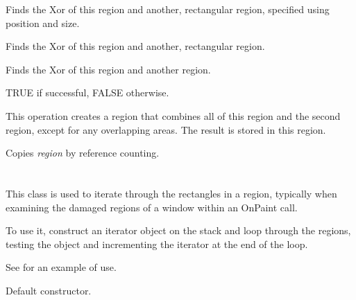Finds the Xor of this region and another, rectangular region, specified using position and size.


Finds the Xor of this region and another, rectangular region.


Finds the Xor of this region and another region.


TRUE if successful, FALSE otherwise.


This operation creates a region that combines all of this region and the second region, except
for any overlapping areas. The result is stored in this region.

\label{wxregionassign}


Copies {\it region} by reference counting.

\section{}\label{wxregioniterator}

This class is used to iterate through the rectangles in a region,
typically when examining the damaged regions of a window within an OnPaint call.

To use it, construct an iterator object on the stack and loop through the
regions, testing the object and incrementing the iterator at the end of the loop.

See  for an example of use.








Default constructor.


